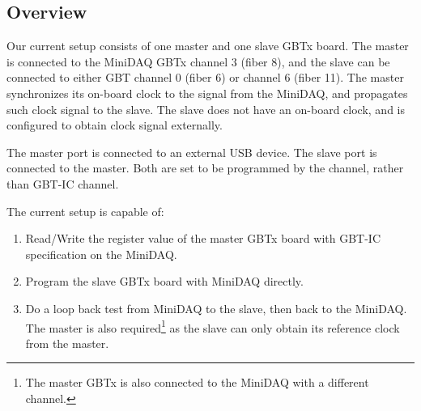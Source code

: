\subsection{Overview}
Our current setup consists of one master and one slave GBTx board.
The master is connected to the MiniDAQ GBTx channel 3 (fiber 8),
and the slave can be connected to either GBT channel 0 (fiber 6) or channel 6
(fiber 11).
The master synchronizes its on-board clock to the signal from the MiniDAQ,
and propagates such clock signal to the slave.
The slave does not have an on-board clock,
and is configured to obtain clock signal externally.

The master \itwoc port is connected to an external USB device.
The slave \itwoc port is connected to the master.
Both are set to be programmed by the \itwoc channel,
rather than GBT-IC channel.

The current setup is capable of:
\begin{enumerate}
    \item Read/Write the register value of the master GBTx board with GBT-IC
        specification on the MiniDAQ.
    \item Program the slave GBTx board with MiniDAQ directly.
    \item Do a loop back test from MiniDAQ to the slave, then back to the
        MiniDAQ.
        The master is also required\footnote{
            The master GBTx is also connected to the MiniDAQ with a different
        channel.}
        as the slave can only obtain its reference clock from the master.
\end{enumerate}
